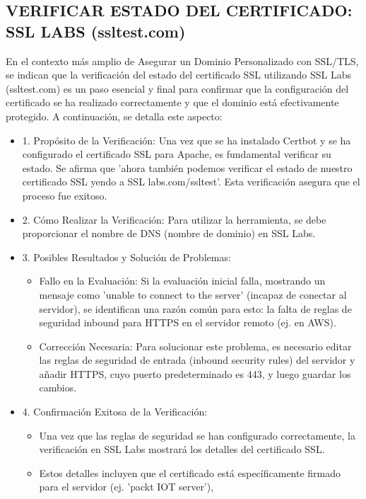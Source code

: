 \documentclass{report}
\begin{document}
\subsection{VERIFICAR ESTADO DEL CERTIFICADO: SSL LABS (ssltest.com)}
En el contexto más amplio de Asegurar un Dominio Personalizado con SSL/TLS, se  indican que la verificación del estado del 
certificado SSL utilizando SSL Labs (ssltest.com) es un paso esencial y final para confirmar que la configuración del certificado 
se ha realizado correctamente y que el dominio está efectivamente protegido.
A continuación, se detalla este aspecto:
\begin{itemize}
    \item 1. Propósito de la Verificación: Una vez que se ha instalado Certbot y se ha configurado el certificado SSL para Apache, es 
    fundamental verificar su estado. Se afirma que 'ahora también podemos verificar el estado de nuestro certificado SSL yendo 
    a SSL labs.com/ssltest'. Esta verificación asegura que el proceso fue exitoso.
    \item 2. Cómo Realizar la Verificación: Para utilizar la herramienta, se debe proporcionar el nombre de DNS (nombre de dominio) 
    en SSL Labs.
    \item 3. Posibles Resultados y Solución de Problemas:
        \begin{itemize}
            \item Fallo en la Evaluación: Si la evaluación inicial falla, mostrando un mensaje como 'unable to connect to the server' 
            (incapaz de conectar al servidor), se  identifican una razón común para esto: la falta de reglas de seguridad inbound 
            para HTTPS en el servidor remoto (ej. en AWS).
            \item Corrección Necesaria: Para solucionar este problema, es necesario editar las reglas de seguridad de entrada 
            (inbound security rules) del servidor y añadir HTTPS, cuyo puerto predeterminado es 443, y luego guardar los cambios.
        \end{itemize}
    \item 4. Confirmación Exitosa de la Verificación:
        \begin{itemize}
            \item Una vez que las reglas de seguridad se han configurado correctamente, la verificación en SSL Labs mostrará los detalles 
            del certificado SSL.
            \item Estos detalles incluyen que el certificado está específicamente firmado para el servidor (ej. 'packt IOT server'), 

\end{itemize}
\end{itemize}
\end{document}

